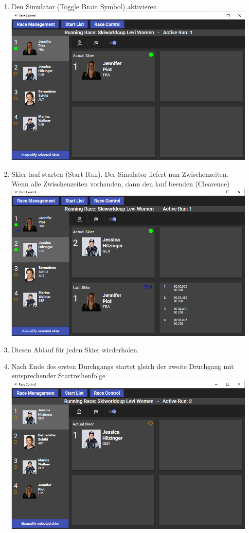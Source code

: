 \documentclass[a4paper, 12pt]{article}
\begin{document}
\begin{enumerate}
		\item{Den Simulator (Toggle Brain Symbol) aktivieren}
		\newline
		\includegraphics[width=.7\textwidth]{img/ui_raceControl_simulator.png}
		\item{Skier lauf starten (Start Run). Der Simulator liefert nun Zwischenzeiten. Wenn alle Zwischenzeiten vorhanden, dann den lauf beenden (Clearence)}
		\newline
		\includegraphics[width=.7\textwidth]{img/ui_raceControl_finsihed.png}
		\item{Diesen Ablauf für jeden Skier wiederholen.}
		\item{Nach Ende des ersten Durchgangs startet gleich der zweite Druchgang mit entsprechender Startreihenfolge}
				\newline
		\includegraphics[width=.7\textwidth]{img/ui_raceControl_run2.png}
		
	\end{enumerate}
\end{document}
